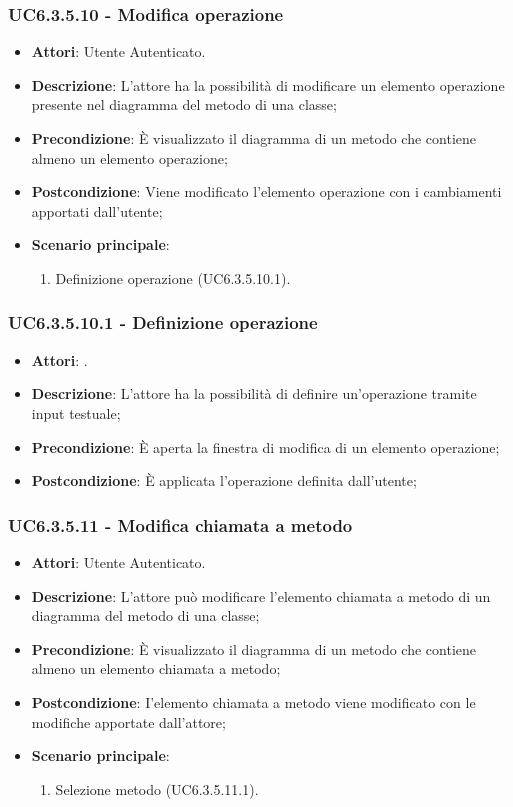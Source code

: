 \subsubsection{UC6.3.5.10 - Modifica operazione} 
\label{sssec:UC6.3.5.10} 
\begin{itemize} 
\item \textbf{Attori}: Utente Autenticato.
\item \textbf{Descrizione}: L'attore ha la possibilità di modificare un elemento operazione presente nel diagramma del metodo di una classe;
\item \textbf{Precondizione}: È visualizzato il diagramma di un metodo che contiene almeno un elemento operazione;
\item \textbf{Postcondizione}: Viene modificato l'elemento operazione con i cambiamenti apportati dall'utente;
\item \textbf{Scenario principale}: \begin{enumerate}\item Definizione operazione (UC6.3.5.10.1). 
 \end{enumerate}
\end{itemize} 
\subsubsection{UC6.3.5.10.1 - Definizione operazione} 
\label{sssec:UC6.3.5.10.1} 
\begin{itemize} 
\item \textbf{Attori}: .
\item \textbf{Descrizione}: L'attore ha la possibilità di definire un'operazione tramite input testuale;
\item \textbf{Precondizione}: È aperta la finestra di modifica di un elemento operazione;
\item \textbf{Postcondizione}: È applicata l'operazione definita dall'utente;
\end{itemize} 
\subsubsection{UC6.3.5.11 - Modifica chiamata a metodo} 
\label{sssec:UC6.3.5.11} 
\begin{itemize} 
\item \textbf{Attori}: Utente Autenticato.
\item \textbf{Descrizione}: L'attore può modificare l'elemento chiamata a metodo di un diagramma del metodo di una classe;
\item \textbf{Precondizione}: È visualizzato il diagramma di un metodo che contiene almeno un elemento chiamata a metodo;
\item \textbf{Postcondizione}: I'elemento chiamata a metodo viene modificato con le modifiche apportate dall'attore;
\item \textbf{Scenario principale}: \begin{enumerate}\item Selezione metodo (UC6.3.5.11.1). 
 \end{enumerate}
\end{itemize} 
